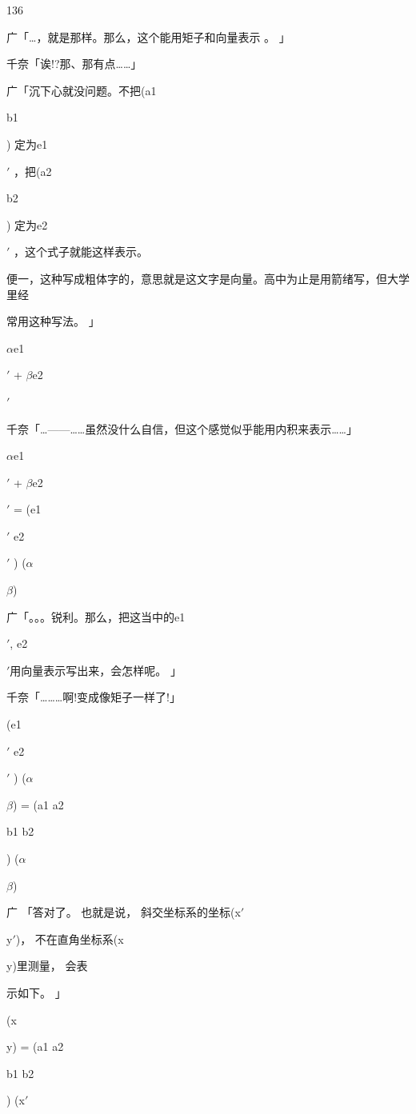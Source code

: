136\par
广「…，就是那样。那么，这个能用矩子和向量表示 。 」\par
千奈「诶!?那、那有点……」\par
广「沉下心就没问题。不把(a1\par
b1\par
) 定为e1\par
$\prime$ ，把(a2\par
b2\par
) 定为e2\par
$\prime$ ，这个式子就能这样表示。\par
便一，这种写成粗体字的，意思就是这文字是向量。高中为止是用箭绪写，但大学里经\par
常用这种写法。 」\par
$\alpha$e1\par
$\prime$ + $\beta$e2\par
$\prime$\par
千奈「…——……虽然没什么自信，但这个感觉似乎能用内积来表示……」\par
$\alpha$e1\par
$\prime$ + $\beta$e2\par
$\prime$ = (e1\par
$\prime$ e2\par
$\prime$ ) ($\alpha$\par
$\beta$)\par
广「。。。锐利。那么，把这当中的e1\par
$\prime$, e2\par
$\prime$用向量表示写出来，会怎样呢。 」\par
千奈「………啊!变成像矩子一样了!」\par
(e1\par
$\prime$ e2\par
$\prime$ ) ($\alpha$\par
$\beta$) = (a1 a2\par
b1 b2\par
) ($\alpha$\par
$\beta$)\par
广 「答对了。 也就是说， 斜交坐标系的坐标(x$\prime$\par
y$\prime$)， 不在直角坐标系(x\par
y)里测量， 会表\par
示如下。 」\par
(x\par
y) = (a1 a2\par
b1 b2\par
) (x$\prime$\par
